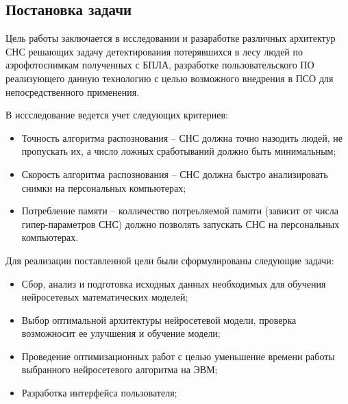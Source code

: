 \subsection{Постановка задачи}

Цель работы заключается в исследовании и разаработке различных архитектур СНС решающих задачу детектирования потерявшихся в лесу людей по аэрофотоснимкам полученных с БПЛА, разработке пользовательского ПО реализующего данную технологию с целью возможного внедрения в ПСО для непосредственного применения.

В иссследование ведется учет следующих критериев:
\begin{itemize}
    \item Точность алгоритма распознования -- СНС должна точно назодить людей, не пропускать их, а число ложных сработываний должно быть минимальным;
    \item Скорость алгоритма распознования -- СНС должна быстро анализировать снимки на персональных компьютерах;
    \item Потребление памяти -- колличество потреьляемой памяти (зависит от числа гипер-параметров СНС) должно позволять запускать СНС на персональных компьютерах.
\end{itemize}

Для реализации поставленной цели были сформулированы следующие задачи:
\begin{itemize}
    \item Сбор, анализ и подготовка исходных данных необходимых для обучения нейросетевых математических моделей;
    \item Выбор оптимальной архитектуры нейросетевой модели, проверка возможносит ее улучшения и обучение модели;
    \item Проведение оптимизационных работ с целью уменьшение времени работы выбранного нейросетевого алгоритма на ЭВМ;
    \item Разработка интерфейса пользователя;
\end{itemize}
